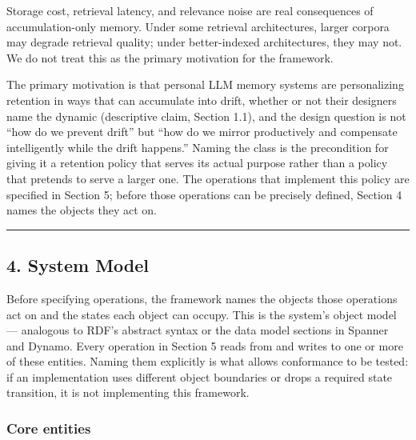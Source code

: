\documentclass[
  11pt,
]{article}
\begin{document}
Storage cost, retrieval latency, and relevance noise are real
consequences of accumulation-only memory. Under some retrieval
architectures, larger corpora may degrade retrieval quality; under
better-indexed architectures, they may not. We do not treat this as the
primary motivation for the framework.

The primary motivation is that personal LLM memory systems are
personalizing retention in ways that can accumulate into drift, whether
or not their designers name the dynamic (descriptive claim, Section
1.1), and the design question is not ``how do we prevent drift'' but
``how do we mirror productively and compensate intelligently while the
drift happens.'' Naming the class is the precondition for giving it a
retention policy that serves its actual purpose rather than a policy
that pretends to serve a larger one. The operations that implement this
policy are specified in Section 5; before those operations can be
precisely defined, Section 4 names the objects they act on.

\begin{center}\rule{0.5\linewidth}{0.5pt}\end{center}

\hypertarget{system-model}{%
\subsection{4. System Model}\label{system-model}}

Before specifying operations, the framework names the objects those
operations act on and the states each object can occupy. This is the
system's object model --- analogous to RDF's abstract syntax or the data
model sections in Spanner and Dynamo. Every operation in Section 5 reads
from and writes to one or more of these entities. Naming them explicitly
is what allows conformance to be tested: if an implementation uses
different object boundaries or drops a required state transition, it is
not implementing this framework.

\hypertarget{core-entities}{%
\subsubsection{Core entities}\label{core-entities}}
\end{document}
